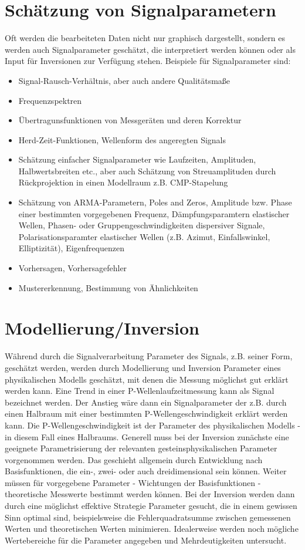 \section{Schätzung von Signalparametern}
Oft werden die bearbeiteten Daten nicht nur graphisch dargestellt, sondern es werden auch Signalparameter geschätzt, die interpretiert werden können oder als Input für Inversionen zur Verfügung stehen. Beispiele für Signalparameter sind:
\begin{itemize}
\item Signal-Rausch-Verhältnis, aber auch andere Qualitätsmaße
\item Frequenzspektren
\item Übertragunsfunktionen von Messgeräten und deren Korrektur
\item Herd-Zeit-Funktionen, Wellenform des angeregten Signals
\item Schätzung einfacher Signalparameter wie Laufzeiten, Amplituden, Halbwertsbreiten etc., aber auch Schätzung von Streuamplituden durch Rückprojektion in einen Modellraum z.B. CMP-Stapelung
\item Schätzung von ARMA-Parametern, Poles and Zeros, Amplitude bzw. Phase einer bestimmten vorgegebenen Frequenz, Dämpfungsparamtern elastischer Wellen, Phasen- oder Gruppengeschwindigkeiten dispersiver Signale, Polarisationsparamter elastischer Wellen (z.B. Azimut, Einfallswinkel, Elliptizität), Eigenfrequenzen
\item Vorhersagen, Vorhersagefehler
\item Mustererkennung, Bestimmung von Ähnlichkeiten
  \end{itemize}

\section{Modellierung/Inversion}
Während durch die Signalverarbeitung Parameter des Signals, z.B. seiner Form, geschätzt werden, werden durch Modellierung und Inversion Parameter eines physikalischen Modells geschätzt, mit denen die Messung möglichst gut erklärt werden kann. Eine Trend in einer P-Wellenlaufzeitmessung kann als Signal bezeichnet werden. Der Anstieg wäre dann ein Signalparameter der z.B. durch einen Halbraum mit einer bestimmten P-Wellengeschwindigkeit erklärt werden kann. Die P-Wellengeschwindigkeit ist der Parameter des physikalischen Modells - in diesem Fall eines Halbraums. Generell muss bei der Inversion zunächste eine geeignete Parametrisierung der relevanten gesteinsphysikalischen Parameter vorgenommen werden. Das geschieht allgemein durch Entwicklung nach Basisfunktionen, die ein-, zwei- oder auch dreidimensional sein können.  Weiter müssen für vorgegebene Parameter - Wichtungen der Basisfunktionen - theoretische Messwerte bestimmt werden können. Bei der Inversion werden dann durch eine möglichst effektive Strategie Parameter gesucht, die in einem gewissen Sinn optimal sind, beispielsweise die Fehlerquadratsumme zwischen gemessenen Werten und theoretischen Werten minimieren. Idealerweise werden noch mögliche Wertebereiche für die Parameter angegeben und Mehrdeutigkeiten untersucht.  